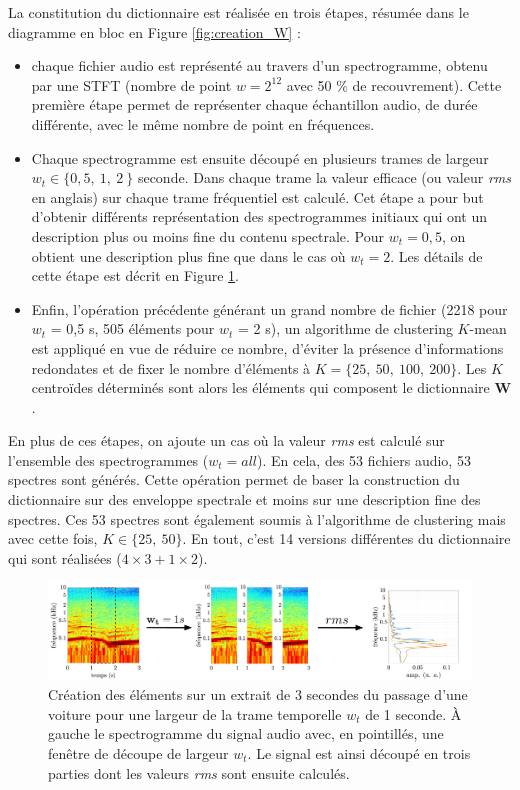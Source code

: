 La constitution du dictionnaire est réalisée en trois étapes, résumée dans le diagramme en bloc en Figure \ref{fig:creation_W} : 
\begin{itemize}
\item chaque fichier audio est représenté au travers d'un spectrogramme, obtenu par une STFT (nombre de point $w = 2^{12}$ avec 50 $\%$ de recouvrement). Cette première étape permet de représenter chaque échantillon audio, de durée différente, avec le même nombre de point en fréquences.
\item Chaque spectrogramme est ensuite découpé en plusieurs trames de largeur $w_t \in \lbrace 0,5,~ 1,~ 2~\rbrace$ seconde. Dans chaque trame la valeur efficace (ou valeur \textit{rms} en anglais) sur chaque trame fréquentiel est calculé. Cet étape a pour but d'obtenir différents représentation des spectrogrammes initiaux qui ont un description plus ou moins fine du contenu spectrale. Pour $w_t = 0,5$, on obtient une description plus fine que dans le cas où $w_t = 2$. Les détails de cette étape est décrit en Figure \ref{fig:decoupe_W}.
\item Enfin, l'opération précédente générant un grand nombre de fichier (2218 pour $w_t$ = 0,5 s, 505 éléments pour $w_t$ = 2 s), un algorithme de clustering $K$-mean est appliqué en vue de réduire ce nombre, d'éviter la présence d'informations redondates et de fixer le nombre d'éléments à $K = \lbrace 25,~50,~100,~200 \rbrace$. Les $K$ centroïdes déterminés sont alors les éléments qui composent le dictionnaire $\mathbf{W}$.
\end{itemize}

En plus de ces étapes, on ajoute un cas où la valeur \textit{rms} est calculé sur l'ensemble des spectrogrammes ($w_t = all$). En cela, des 53 fichiers audio, 53 spectres sont générés. Cette opération permet de baser la construction du dictionnaire sur des enveloppe spectrale et moins sur une description fine des spectres. Ces 53 spectres sont également soumis à l'algorithme de clustering mais avec cette fois, $K \in \lbrace 25,~ 50 \rbrace$. En tout, c'est 14 versions différentes du dictionnaire qui sont réalisées ($4\times 3 + 1 \times 2$).

\begin{figure}[hbtp]
\centering
\includegraphics[width=.9\linewidth]{./figures/NMF/dictionaire_frame_FR.pdf} 
\caption{Création des éléments sur un extrait de 3 secondes du passage d'une voiture pour une largeur de la trame temporelle $w_t$ de 1 seconde. À gauche le spectrogramme du signal audio avec, en pointillés, une fenêtre de découpe de largeur $w_t$. Le signal est ainsi découpé en trois parties dont les valeurs \textit{rms} sont ensuite calculés. }
\label{fig:decoupe_W}
\end{figure}

